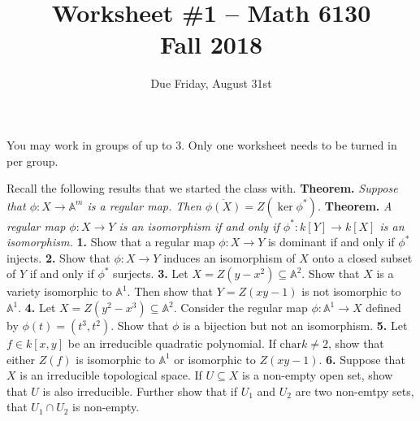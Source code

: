\documentclass[11pt]{amsart}
\theoremstyle{theorem}
\renewcommand{\to}[1][]{\xrightarrow{\ #1\ }}
\newcommand{\bA}{\mathbb{A}}
\begin{document}
\title{Worksheet \#1 -- Math 6130\\Fall 2018}
\author{Due Friday, August 31st}

\maketitle
You may work in groups of up to 3.  Only one worksheet needs to be turned in per group.

Recall the following results that we started the class with.
\vskip 9pt
{\bf Theorem.} {\it Suppose that $\phi : X \to \bA^m$ is a regular map.  Then $\overline{\phi(X)} = Z(\ker \phi^*)$.}
\vskip 9pt
{\bf Theorem.} {\it A regular map $\phi : X \to Y$ is an isomorphism if and only if $\phi^* : k[Y] \to k[X]$ is an isomorphism.}
\vskip 9pt
\noindent
{\bf 1.} Show that a regular map $\phi : X \to Y$ is dominant if and only if $\phi^*$ injects.  
\vskip 200pt
{\bf 2.}  Show that $\phi : X \to Y$ induces an isomorphism of $X$ onto a closed subset of $Y$ if and only if $\phi^*$ surjects.  
\noindent
\newpage
\noindent
{\bf 3.}  Let $X = Z(y-x^2) \subseteq \bA^2$.  Show that $X$ is a variety isomorphic to $\bA^1$.   Then show that $Y = Z(xy - 1)$ is not isomorphic to $\bA^1$.  
\vskip 300pt
\noindent
{\bf 4.}  Let $X = Z(y^2 - x^3) \subseteq \bA^2$.  Consider the regular map $\phi : \bA^1 \to X$ defined by $\phi(t) = (t^3, t^2)$.  Show that $\phi$ is a bijection but not an isomorphism.
\newpage
\noindent
{\bf 5.}  Let $f \in k[x,y]$ be an irreducible quadratic polynomial.  If $\mathrm{char} k \neq 2$, show that either $Z(f)$ is isomorphic to $\bA^1$ or isomorphic to $Z(xy-1)$.
\vskip 300pt
\noindent
{\bf 6.}  Suppose that $X$ is an irreducible topological space.  If $U \subseteq X$ is a non-empty open set, show that $U$ is also irreducible.  Further show that if $U_1$ and $U_2$ are two non-emtpy sets, that $U_1 \cap U_2$ is non-empty.
\end{document}
